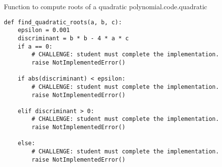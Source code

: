 \begin{listing}{Function to compute roots of a quadratic polynomial.}{code.quadratic}
\begin{minipage}[c]{0.95\textwidth}\begin{lstlisting}
def find_quadratic_roots(a, b, c):
    epsilon = 0.001
    discriminant = b * b - 4 * a * c
    if a == 0:
        # CHALLENGE: student must complete the implementation.
        raise NotImplementedError()

    if abs(discriminant) < epsilon:
        # CHALLENGE: student must complete the implementation.
        raise NotImplementedError()

    elif discriminant > 0:
        # CHALLENGE: student must complete the implementation.
        raise NotImplementedError()

    else:
        # CHALLENGE: student must complete the implementation.
        raise NotImplementedError()

\end{lstlisting}\end{minipage}\end{listing}

